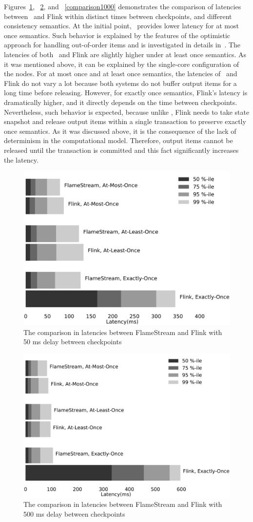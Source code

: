 Figures~\ref{comparison50}, ~\ref{comparison500}, and ~\ref{comparison1000} demonstrates the comparison of latencies between \FlameStream\ and Flink within distinct times between checkpoints, and different consistency semantics. At the initial point, \FlameStream\ provides lower latency for at most once semantics. Such behavior is explained by the features of the optimistic approach for handling out-of-order items and is investigated in details in~\cite{hiddenSeim}. The latencies of both \FlameStream\ and Flink are slightly higher under at least once semantics. As it was mentioned above, it can be explained by the single-core configuration of the nodes. For at most once and at least once semantics, the latencies of \FlameStream\ and Flink do not vary a lot because both systems do not buffer output items for a long time before releasing. However, for exactly once semantics, Flink's latency is dramatically higher, and it directly depends on the time between checkpoints. Nevertheless, such behavior is expected, because unlike \FlameStream, Flink needs to take state snapshot and release output items within a single transaction to preserve exactly once semantics. As it was discussed above, it is the consequence of the lack of determinism in the computational model. Therefore, output items cannot be released until the transaction is committed and this fact significantly increases the latency. 

\begin{figure}[htbp]
  \centering
  \includegraphics[width=.5\textwidth]{pics/comparison50}
  \caption{The comparison in latencies between FlameStream and Flink with 50 ms delay between checkpoints}
  \label {comparison50}
\end{figure}

\begin{figure}[htbp]
  \centering
  \includegraphics[width=.5\textwidth]{pics/comparison500}
  \caption{The comparison in latencies between FlameStream and Flink with 500 ms delay between checkpoints}
  \label {comparison500}
\end{figure}

